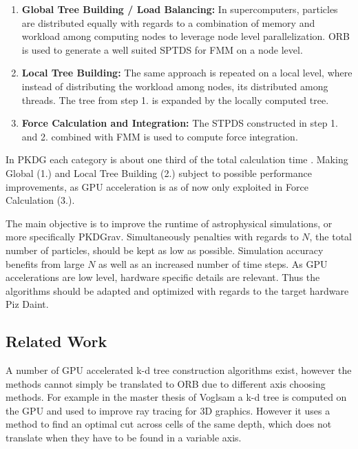 \documentclass[]{article}
\begin{document}
\begin{enumerate}
	\item \textbf{Global Tree Building / Load Balancing:} In supercomputers, particles are distributed equally with regards to a combination of memory and workload among computing nodes to leverage node level parallelization. ORB is used to generate a well suited SPTDS for FMM on a node level.
	\item \textbf{Local Tree Building:} The same approach is repeated on a local level, where instead of distributing the workload among nodes, its distributed among threads. The tree from step 1. is expanded by the locally computed tree.
	\item \textbf{Force Calculation and Integration:} The STPDS constructed in step 1. and 2. combined with FMM is used to compute force integration. 
\end{enumerate}

In PKDG each category is about one third of the total calculation time \cite{Stadel2001}. Making Global (1.) and Local Tree Building (2.) subject to possible performance improvements, as GPU acceleration is as of now only exploited in Force Calculation (3.).

The main objective is to improve the runtime of astrophysical simulations, or more specifically PKDGrav. Simultaneously penalties with regards to $N$, the total number of particles, should be kept as low as possible. Simulation accuracy benefits from large $N$ as well as an increased number of time steps. As GPU accelerations are low level, hardware specific details are relevant. Thus the algorithms should be adapted and optimized with regards to the target hardware Piz Daint.

\subsection{Related Work}


A number of GPU accelerated k-d tree construction algorithms exist, however the methods cannot simply be translated to ORB due to different axis choosing methods. For example in the master thesis of Voglsam \cite{rrt} a k-d tree is computed on the GPU and used to improve ray tracing for 3D graphics. However it uses a method to find an optimal cut across cells of the same depth, which does not translate when they have to be found in a variable axis.
\end{document}
